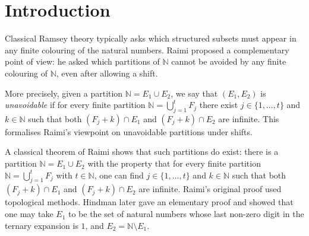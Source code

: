 \documentclass[11pt]{article}
\numberwithin{equation}{section}
\theoremstyle{remark}
\begin{document}
\section{Introduction}
Classical Ramsey theory typically asks which structured subsets must appear in any finite colouring of the natural numbers. Raimi proposed a complementary point of view: he asked which partitions of $\mathbb{N}$ cannot be avoided by any finite colouring of $\mathbb{N}$, even after allowing a shift.

More precisely, given a partition $\mathbb{N}=E_1\cup E_2$, we say that $(E_1,E_2)$ is \emph{unavoidable} if for every finite partition $\mathbb{N}=\bigcup\limits_{j=1}^t F_j$ there exist $j\in\{1,\dots,t\}$ and $k\in\mathbb{N}$ such that both $(F_j+k)\cap E_1$ and $(F_j+k)\cap E_2$ are infinite. This formalises Raimi’s viewpoint on unavoidable partitions under shifts.


A classical theorem of Raimi \cite{Raimi} shows that such partitions do exist: there is a partition $\mathbb{N}=E_1\cup E_2$ with the property that for every finite partition $\mathbb{N}=\bigcup\limits_{j=1}^t F_j$ with $t\in\mathbb{N}$, one can find $j\in\{1,\dots,t\}$ and $k\in\mathbb{N}$ such that both $(F_j+k)\cap E_1$ and $(F_j+k)\cap E_2$ are infinite. Raimi’s original proof used topological methods. Hindman later gave an elementary proof \cite[p.~180, Theorem~11.15]{HM79} and showed that one may take $E_1$ to be the set of natural numbers whose last non-zero digit in the ternary expansion is $1$, and $E_2=\mathbb{N}\setminus E_1$.
\end{document}
